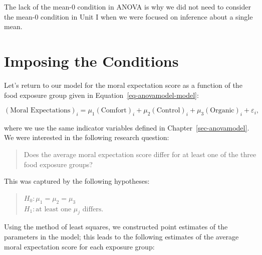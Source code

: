 \documentclass[
  letterpaper,
  DIV=11,
  numbers=noendperiod]{scrreprt}
\theoremstyle{definition}
\theoremstyle{definition}
\theoremstyle{plain}
\theoremstyle{remark}
\begin{document}
\begin{tcolorbox}[enhanced jigsaw, colbacktitle=quarto-callout-note-color!10!white, colback=white, left=2mm, title=\textcolor{quarto-callout-note-color}{\faInfo}\hspace{0.5em}{Note}, toptitle=1mm, leftrule=.75mm, breakable, bottomrule=.15mm, arc=.35mm, rightrule=.15mm, toprule=.15mm, coltitle=black, opacityback=0, colframe=quarto-callout-note-color-frame, opacitybacktitle=0.6, bottomtitle=1mm, titlerule=0mm]

The lack of the mean-0 condition in ANOVA is why we did not need to
consider the mean-0 condition in Unit I when we were focused on
inference about a single mean.

\end{tcolorbox}

\section{Imposing the Conditions}\label{imposing-the-conditions-1}

Let's return to our model for the moral expectation score as a function
of the food exposure group given in Equation~\ref{eq-anovamodel-model}:

\[(\text{Moral Expectations})_i = \mu_1 (\text{Comfort})_i + \mu_2 (\text{Control})_i + \mu_3 (\text{Organic})_i + \varepsilon_i,\]

where we use the same indicator variables defined in
Chapter~\ref{sec-anovamodel}. We were interested in the following
research question:

\begin{quote}
Does the average moral expectation score differ for at least one of the
three food exposure groups?
\end{quote}

This was captured by the following hypotheses:

\begin{quote}
\(H_0: \mu_1 = \mu_2 = \mu_3\)\\
\(H_1: \text{at least one } \mu_j \text{ differs}.\)
\end{quote}

Using the method of least squares, we constructed point estimates of the
parameters in the model; this leads to the following estimates of the
average moral expectation score for each exposure group:
\end{document}
